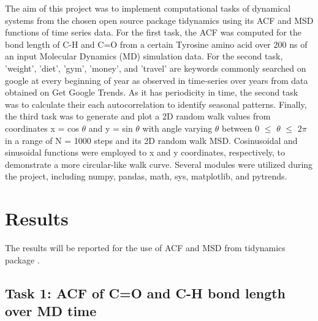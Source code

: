 \documentclass{article}
\begin{document}
The aim of this project was to implement computational tasks of dynamical systems from the chosen open source package tidynamics \cite{Buyl2018} using its ACF and MSD functions of time series data. For the first task, the ACF was computed for the bond length of C-H and C=O from a certain Tyrosine amino acid over 200 ns of an input Molecular Dynamics (MD) simulation data. For the second task, 'weight', 'diet', 'gym', 'money', and 'travel' are keywords commonly searched on google at every beginning of year as observed in time-series over years from data obtained on Get Google Trends. As it has periodicity in time, the second task was to calculate their each autocorrelation to identify seasonal patterns. Finally, the third task was to generate and plot a 2D random walk values from coordinates x = cos $\theta$ and y = sin $\theta$ with angle varying $\theta$ between 0 $\leq$ $\theta$ $\leq$ $2\pi$ in a range of N = 1000 steps and its 2D random walk MSD. Cosinusoidal and sinusoidal functions were employed to x and y coordinates, respectively, to demonstrate a more circular-like walk curve. Several modules were utilized during the project, including numpy, pandas, math, sys, matplotlib, and pytrends.

\section{Results}

The results will be reported for the use of ACF and MSD from tidynamics package \cite{Buyl2018}.

\subsection{Task 1: ACF of C=O and C-H bond length over MD time}
\end{document}
